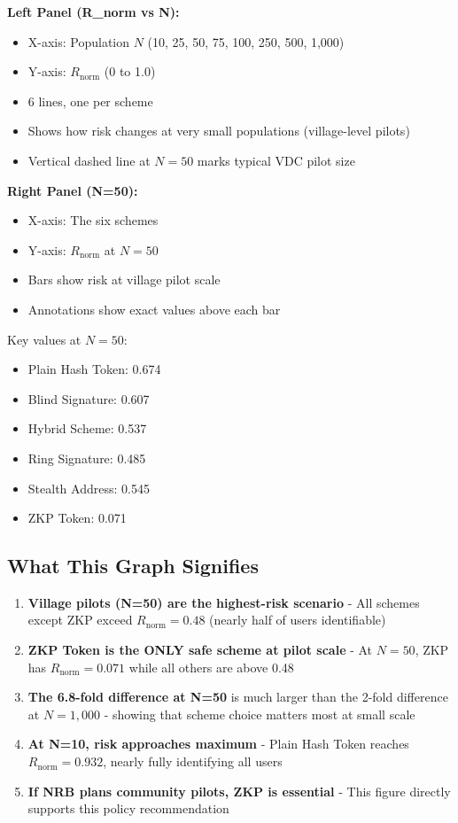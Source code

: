 \documentclass[12pt,a4paper,oneside,openany]{report}
\begin{document}
\begin{enumerate}
\textbf{Left Panel (R\_norm vs N):}
\begin{itemize}
    \item X-axis: Population $N$ (10, 25, 50, 75, 100, 250, 500, 1,000)
    \item Y-axis: $R_{\mathrm{norm}}$ (0 to 1.0)
    \item 6 lines, one per scheme
    \item Shows how risk changes at very small populations (village-level pilots)
    \item Vertical dashed line at $N=50$ marks typical VDC pilot size
\end{itemize}

\textbf{Right Panel (N=50):}
\begin{itemize}
    \item X-axis: The six schemes
    \item Y-axis: $R_{\mathrm{norm}}$ at $N=50$
    \item Bars show risk at village pilot scale
    \item Annotations show exact values above each bar
\end{itemize}

Key values at $N=50$:
\begin{itemize}
    \item Plain Hash Token: 0.674
    \item Blind Signature: 0.607
    \item Hybrid Scheme: 0.537
    \item Ring Signature: 0.485
    \item Stealth Address: 0.545
    \item ZKP Token: 0.071
\end{itemize}

\subsection{What This Graph Signifies}
\begin{enumerate}
    \item \textbf{Village pilots (N=50) are the highest-risk scenario} - All schemes except ZKP exceed $R_{\mathrm{norm}} = 0.48$ (nearly half of users identifiable)
    \item \textbf{ZKP Token is the ONLY safe scheme at pilot scale} - At $N=50$, ZKP has $R_{\mathrm{norm}} = 0.071$ while all others are above 0.48
    \item \textbf{The 6.8-fold difference at N=50} is much larger than the 2-fold difference at $N=1,000$ - showing that scheme choice matters most at small scale
    \item \textbf{At N=10, risk approaches maximum} - Plain Hash Token reaches $R_{\mathrm{norm}} = 0.932$, nearly fully identifying all users
    \item \textbf{If NRB plans community pilots, ZKP is essential} - This figure directly supports this policy recommendation
\end{enumerate}


\end{enumerate}
\end{document}
